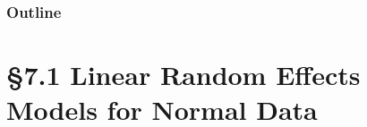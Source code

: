 \documentclass{beamer}
\newcommand{\currentsection}{}
\let\oldsection\section
\renewcommand{\section}[1]{\oldsection{#1}\renewcommand{\currentsection}{#1}}
\begin{document}
%

\begin{frame}[fragile] \frametitle{Outline}
{\normalsize
\tableofcontents}
\end{frame}



%
%
%
%
%
%
%




\section{\S7.1 Linear Random Effects Models for Normal Data}\label{sec:7.1}

%
\end{document}
